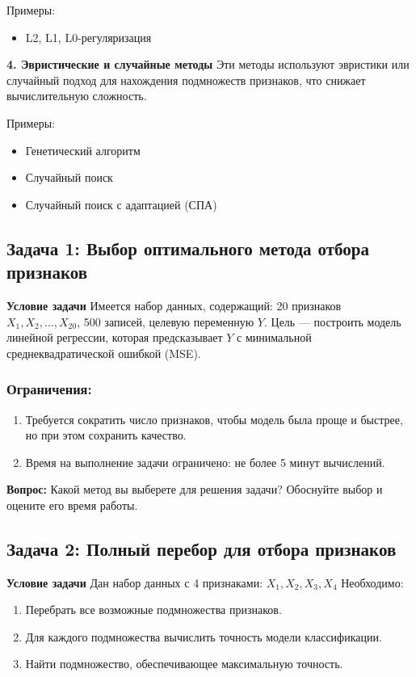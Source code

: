 Примеры:
\begin{itemize}
    \item L2, L1, L0-регуляризация 
\end{itemize}

\textbf{4. Эвристические и случайные методы}
Эти методы используют эвристики или случайный подход для нахождения подмножеств признаков, что снижает вычислительную сложность.  

Примеры:
\begin{itemize}
    \item Генетический алгоритм
    \item Случайный поиск 
    \item Случайный поиск с адаптацией (СПА) 
\end{itemize}

\subsection*{Задача 1: Выбор оптимального метода отбора признаков}

\textbf{Условие задачи}
Имеется набор данных, содержащий: 20 признаков \( X_1, X_2, \dots, X_{20} \), 500 записей, целевую переменную \( Y \). 
Цель — построить модель линейной регрессии, которая предсказывает \( Y \) с минимальной среднеквадратической ошибкой (MSE).  
\subsubsection*{Ограничения:}
\begin{enumerate}
    \item Требуется сократить число признаков, чтобы модель была проще и быстрее, но при этом сохранить качество.  
    \item Время на выполнение задачи ограничено: не более 5 минут вычислений.  
\end{enumerate}

\textbf{Вопрос:} Какой метод вы выберете для решения задачи? Обоснуйте выбор и оцените его время работы.
\subsection*{Задача 2: Полный перебор для отбора признаков}

\textbf{Условие задачи}
Дан набор данных с 4 признаками: $X_1, X_2, X_3, X_4$
Необходимо:  
\begin{enumerate}
    \item Перебрать все возможные подмножества признаков.
    \item Для каждого подмножества вычислить точность модели классификации.
    \item Найти подмножество, обеспечивающее максимальную точность.
\end{enumerate}

